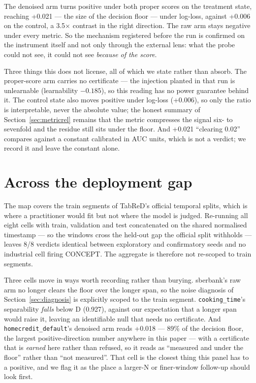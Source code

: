 \documentclass[10pt]{article} %
\begin{document}
The denoised arm turns positive under both proper scores on the treatment state, reaching +0.021 ---
the size of the decision floor --- under log-loss, against +0.006 on the control, a 3.5$\times$ contrast in
the right direction. The raw arm stays negative under every metric. So the mechanism registered
before the run is confirmed on the instrument itself and not only through the external lens: what
the probe could not see, it could not see \emph{because of the score}.

Three things this does not license, all of which we state rather than absorb. The proper-score arm
carries no certificate --- the injection planted in that run is unlearnable (learnability $-0.185$),
so this reading has no power guarantee behind it. The control state also moves positive under
log-loss (+0.006), so only the ratio is interpretable, never the absolute value; the honest summary
of Section~\ref{sec:metricrel} remains that the metric compresses the signal six- to sevenfold and the residue still sits
under the floor. And +0.021 ``clearing 0.02'' compares against a constant calibrated in AUC units,
which is not a verdict; we record it and leave the constant alone.

\section{Across the deployment gap}\label{sec:gap}

The map covers the train segments of TabReD's official temporal splits, which is where a
practitioner would fit but not where the model is judged. Re-running all eight cells with train,
validation and test concatenated on the shared normalised timestamp --- so the windows cross the
held-out gap the official split withholds --- leaves 8/8 verdicts identical between exploratory and
confirmatory seeds and no industrial cell firing CONCEPT. The aggregate is therefore not
re-scoped to train segments.

Three cells move in ways worth recording rather than burying. sberbank's raw arm no longer clears
the floor over the longer span, so the noise diagnosis of Section~\ref{sec:diagnosis} is explicitly scoped to the train
segment. \texttt{cooking\_time}'s separability \emph{falls} below D\* (0.927), against our expectation that a
longer span would raise it, leaving an identifiable null that needs no certificate. And
\texttt{homecredit\_default}'s denoised arm reads +0.018 --- 89\% of the decision floor, the largest
positive-direction number anywhere in this paper --- with a certificate that is \emph{earned} here rather
than refused, so it reads as ``measured and under the floor'' rather than ``not measured''. That cell
is the closest thing this panel has to a positive, and we flag it as the place a larger-N or
finer-window follow-up should look first.
\end{document}
